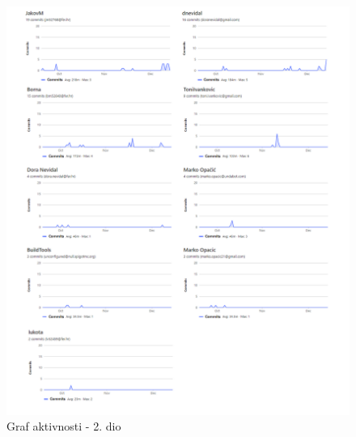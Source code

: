\begin{figure}
    \centering
    \includegraphics{slike/Graf aktivnosti - 2.png}
    \caption{Graf aktivnosti - 2. dio}
    \label{fig:grarf_aktivnosti_2}
\end{figure}
		
	